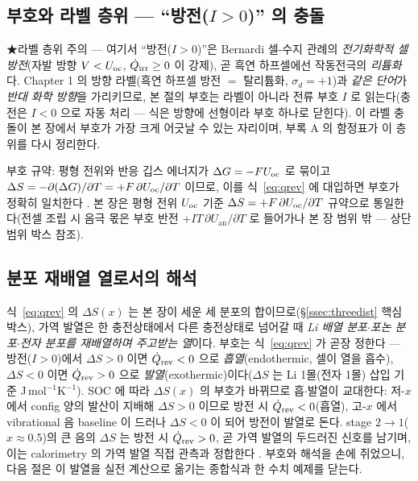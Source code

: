 \subsection{부호와 라벨 층위 --- ``방전($I>0$)'' 의 충돌}\label{ssec:signlabel}
★라벨 층위 주의 --- 여기서 ``방전($I>0$)''은 Bernardi 셀-수지 관례의 \emph{전기화학적 셀 방전}(자발 방향
$V<U_{\mathrm{oc}}$, $\dot Q_{\mathrm{irr}}\ge0$ 이 강제), 곧 흑연 하프셀에선 작동전극의 \emph{리튬화}다. Chapter 1 의 방향
라벨(흑연 하프셀 방전 $=$ 탈리튬화, $\sigma_d{=}+1$)과 \emph{같은 단어}가 \emph{반대 화학 방향}을 가리키므로,
본 절의 부호는 라벨이 아니라 전류 부호 $I$ 로 읽는다(충전은 $I<0$ 으로 자동 처리 --- 식은 방향에 선형이라 부호
하나로 닫힌다). 이 라벨 충돌이 본 장에서 부호가 가장 크게 어긋날 수 있는 자리이며, 부록 A 의 함정표가 이
층위를 다시 정리한다.
\begin{srcbox}
부호 규약: 평형 전위와 반응 깁스 에너지가 $\Delta G=-FU_{\mathrm{oc}}$ 로 묶이고 $\Delta S=-\partial(\Delta
G)/\partial T=+F\,\partial U_{\mathrm{oc}}/\partial T$ 이므로, 이를 식~\eqref{eq:qrev} 에 대입하면 부호가 정확히 일치한다
\cite{newman,msmr_partI}. 본 장은 평형 전위 $U_{\mathrm{oc}}$ 기준 $\Delta S=+F\,\partial U_{\mathrm{oc}}/\partial T$ 규약으로
통일한다(전셀 조립 시 음극 몫은 부호 반전 $+IT\,\partial U_\mathrm{an}/\partial T$ 로 들어가나 본 장 범위 밖 ---
상단 범위 박스 참조).
\end{srcbox}

\subsection{분포 재배열 열로서의 해석}\label{ssec:revinterp}
식~\eqref{eq:qrev} 의 $\Delta S(x)$ 는 본 장이 세운 세 분포의 합이므로(\S\ref{ssec:threedist} 핵심 박스),
가역 발열은 한 충전상태에서 다른 충전상태로 넘어갈 때 \emph{Li 배열 분포$\cdot$포논 분포$\cdot$전자 분포를
재배열하며 주고받는 열}이다. 부호는 식~\eqref{eq:qrev} 가 곧장 정한다 --- 방전($I>0$)에서 $\Delta S>0$ 이면
$\dot Q_{\mathrm{rev}}<0$ 으로 \emph{흡열}(endothermic, 셀이 열을 흡수), $\Delta S<0$ 이면 $\dot Q_{\mathrm{rev}}>0$ 으로
\emph{발열}(exothermic)이다($\Delta S$ 는 Li 1몰(전자 1몰) 삽입 기준 J\,mol$^{-1}$K$^{-1}$). SOC 에 따라
$\Delta S(x)$ 의 부호가 바뀌므로 흡$\cdot$발열이 교대한다: 저-$x$ 에서 config 양의 발산이 지배해 $\Delta S>0$
이므로 방전 시 $\dot Q_{\mathrm{rev}}<0$(흡열), 고-$x$ 에서 vibrational 음 baseline 이 드러나 $\Delta S<0$ 이 되어 방전이
발열로 돈다. stage $2\to1$($x\approx0.5$)의 큰 음의 $\Delta S$ 는 방전 시 $\dot Q_{\mathrm{rev}}>0$, 곧 가역 발열의
두드러진 신호를 남기며, 이는 calorimetry 의 가역 발열 직접 관측과 정합한다 \cite{standardised2024}. 부호와
해석을 손에 쥐었으니, 다음 절은 이 발열을 실전 계산으로 옮기는 종합식과 한 수치 예제를 닫는다.

